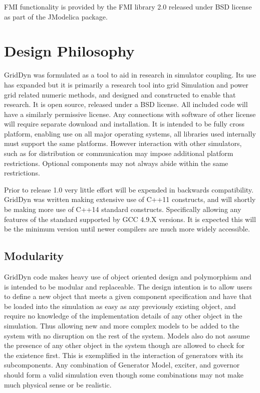 \documentclass[12pt]{article} %
\begin{document}
FMI functionality is provided by the FMI library 2.0 released under BSD license as part of the JModelica package.  

\section {Design Philosophy}
GridDyn was formulated as a tool to aid in research in simulator coupling.  Its use has expanded but it is primarily a research tool into grid Simulation and power grid related numeric methods, and designed and constructed to enable that research.  It is open source, released under a BSD license.  All included code will have a similarly permissive license.  Any connections with software of other license will require separate download and installation.  It is intended to be fully cross platform,  enabling use on all major operating systems,  all libraries used internally must support the same platforms.  However interaction with other simulators, such as for distribution or communication may impose additional platform restrictions.  Optional components may not always abide within the same restrictions.  

Prior to release 1.0 very little effort will be expended in backwards compatibility.  GridDyn was written making extensive use of C++11 constructs, and will shortly be making more use of C++14 standard constructs.  Specifically allowing any features of the standard supported by GCC 4.9.X versions.  It is expected this will be the minimum version until newer compilers are much more widely accessible.  

\subsection{Modularity}
GridDyn code makes heavy use of object oriented design and polymorphism and is intended to be modular and replaceable.  The design intention is to allow users to define a new object that meets a given component specification and have that be loaded into the simulation as easy as any previously existing object, and require no knowledge of the implementation details of any other object in the simulation.  Thus allowing new and more complex models to be added to the system with no disruption on the rest of the system.  Models also do not assume the presence of any other object in the system though are allowed to check for the existence first.  This is exemplified in the interaction of generators with its subcomponents.  Any combination of Generator Model, exciter, and governor should form a valid simulation even though some combinations may not make much physical sense or be realistic.  
\end{document}
